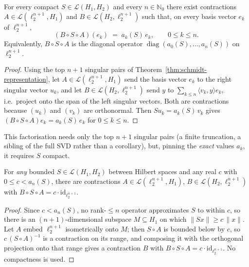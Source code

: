 \begin{theorem}
\label{thm:schmidt-diagonal}
\leanok
{}
For every compact $S \in \mathcal{L}(H_1, H_2)$ and every
$n \in \mathbb{N}_0$ there exist contractions
$A \in \mathcal{L}(\ell_2^{n+1}, H_1)$ and
$B \in \mathcal{L}(H_2, \ell_2^{n+1})$ such that, on every basis vector
$e_k$ of $\ell_2^{n+1}$,
\[
  (B \circ S \circ A)(e_k) \;=\; a_k(S) \, e_k,
  \qquad 0 \le k \le n.
\]
Equivalently, $B \circ S \circ A$ is the diagonal operator
$\operatorname{diag}(a_0(S), \dots, a_n(S))$ on $\ell_2^{n+1}$.
\end{theorem}
\begin{proof}
\leanok
{}
Using the top $n+1$ singular pairs of Theorem~\ref{thm:schmidt-representation},
let $A \in \mathcal{L}(\ell_2^{n+1}, H_1)$ send the basis vector $e_k$ to the
right singular vector $u_k$, and let $B \in \mathcal{L}(H_2, \ell_2^{n+1})$ send
$y$ to $\sum_{k \le n} \langle v_k, y\rangle e_k$, i.e.\ project onto the span of
the left singular vectors. Both are contractions because $(u_k)$ and $(v_k)$ are
orthonormal. Then $S u_k = a_k(S)\, v_k$ gives
$(B \circ S \circ A) e_k = a_k(S)\, e_k$ for $0 \le k \le n$.
\end{proof}

This factorisation needs only the top $n+1$ singular pairs (a finite
truncation, a sibling of the full SVD rather than a corollary), but,
pinning the \emph{exact} values $a_k$, it requires $S$ compact.

\begin{theorem}
\label{thm:scalar-factorisation}
\leanok
For \emph{any} bounded $S \in \mathcal{L}(H_1, H_2)$ between Hilbert spaces
and any real $c$ with $0 \le c < a_n(S)$, there are contractions
$A \in \mathcal{L}(\ell_2^{n+1}, H_1)$, $B \in \mathcal{L}(H_2, \ell_2^{n+1})$
with $B \circ S \circ A = c \cdot \mathrm{id}_{\ell_2^{n+1}}$.
\end{theorem}
\begin{proof}
\leanok
{}
Since $c < a_n(S)$, no rank-$\le n$ operator approximates $S$ to within $c$, so
there is an $(n+1)$-dimensional subspace $M \subseteq H_1$ on which
$\|S x\| \ge c\,\|x\|$. Let $A$ embed $\ell_2^{n+1}$ isometrically onto $M$; then
$S \circ A$ is bounded below by $c$, so $c\,(S \circ A)^{-1}$ is a contraction on
its range, and composing it with the orthogonal projection onto that range gives
a contraction $B$ with $B \circ S \circ A = c \cdot \mathrm{id}_{\ell_2^{n+1}}$.
No compactness is used.
\end{proof}

